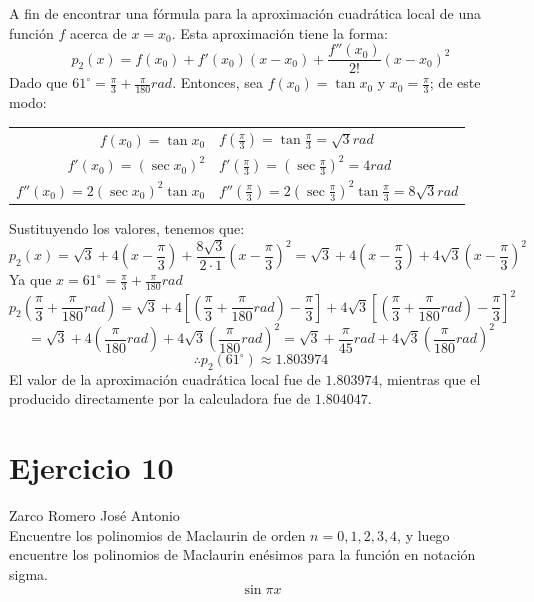 \documentclass[12pt]{article}
\begin{document}
A fin de encontrar una fórmula para la aproximación cuadrática local de una función $f$ acerca de $x=x_0$. Esta aproximación tiene la forma:
\[p_2(x)=f(x_0)+f'(x_0)(x-x_0)+\frac{f''(x_0)}{2!}(x-x_0)^2\]
Dado que $61^{\circ} = \frac{\pi}{3} + \frac{\pi}{180} rad$. Entonces, sea $f(x_0)=\tan x_0$ y $x_0=\frac{\pi}{3}$; de este modo:
\begin{center}
\begin{tabular}{r l}
$f(x_0)=\tan x_0$ & $f(\frac{\pi}{3})=\tan \frac{\pi}{3}=\sqrt 3 rad$ \\
$f'(x_0)=(\sec x_0)^2$ & $f'(\frac{\pi}{3})=(\sec \frac{\pi}{3})^2=4 rad$ \\
$f''(x_0)=2 (\sec x_0)^2 \tan x_0$ & $f''(\frac{\pi}{3})=2 (\sec \frac{\pi}{3})^2 \tan \frac{\pi}{3}=8\sqrt 3 rad$ \\
\end{tabular}
\end{center}
Sustituyendo los valores, tenemos que:
\[
p_2(x)=\sqrt 3 + 4(x-\frac{\pi}{3}) + \frac{8 \sqrt 3}{2 \cdot 1}(x-\frac{\pi}{3})^2
=\sqrt 3 + 4(x-\frac{\pi}{3}) + 4 \sqrt 3(x-\frac{\pi}{3})^2
\]
Ya que $x=61^{\circ}=\frac{\pi}{3} + \frac{\pi}{180}rad$
\[
p_2(\frac{\pi}{3} + \frac{\pi}{180}rad)
=\sqrt 3 + 4[(\frac{\pi}{3} + \frac{\pi}{180}rad)-\frac{\pi}{3}] + 4 \sqrt 3[(\frac{\pi}{3} + \frac{\pi}{180}rad)-\frac{\pi}{3}]^2
\]
\[
=\sqrt 3 + 4(\frac{\pi}{180}rad) + 4 \sqrt 3(\frac{\pi}{180}rad)^2
= \sqrt 3 + \frac{\pi}{45}rad + 4 \sqrt 3(\frac{\pi}{180}rad)^2
\]
\[\therefore p_2(61^{\circ}) \approx 1.803974\]
El valor de la aproximación cuadrática local fue de $1.803974$, mientras que el producido directamente por la calculadora fue de $1.804047$.

\section{Ejercicio 10} Zarco Romero José Antonio \\

Encuentre los polinomios de Maclaurin de orden $n = 0, 1, 2, 3, 4$, y luego encuentre los polinomios de Maclaurin enésimos para la función en notación sigma.
\[\sin \pi x\]
\end{document}
